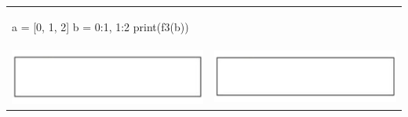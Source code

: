 \begin{center}
\begin{tabular}{l l}
\begin{tabularlstlisting}
a = [0, 1, 2]
b = {0:1, 1:2}
print(f3(b))
    \end{tabularlstlisting}
    \\
    \includegraphics[scale=0.75]{Imagenes/cuadrado} & \includegraphics[scale=0.75]{Imagenes/cuadrado} \\
\end{tabular}
\end{center}

